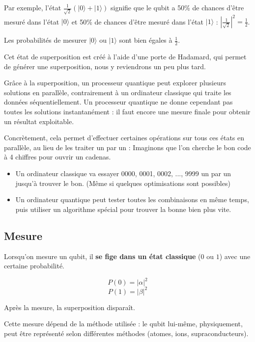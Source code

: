\documentclass{article}
\begin{document}
Par exemple, l’état $\frac{1}{\sqrt{2}}(|0\rangle + |1\rangle)$ signifie que le qubit a 50\% de chances d’être mesuré dans l’état $|0\rangle$ et 50\% de chances d’être mesuré dans l’état $|1\rangle$ : $\left|\frac{1}{\sqrt{2}}\right|^2 = \frac{1}{2}$.

\medskip

Les probabilités de mesurer $|0\rangle$ ou $|1\rangle$ sont bien égales à $\frac{1}{2}$.

Cet état de superposition est créé à l’aide d’une porte de Hadamard, qui permet de générer une superposition, nous y reviendrons un peu plus tard.

Grâce à la superposition, un processeur quantique peut explorer plusieurs solutions en parallèle, contrairement à un ordinateur classique qui traite les données séquentiellement. Un processeur quantique ne donne cependant pas toutes les solutions instantanément : il faut encore une mesure finale pour obtenir un résultat exploitable.

Concrètement, cela permet d’effectuer certaines opérations sur tous ces états en parallèle, au lieu de les traiter un par un : Imaginons que l’on cherche le bon code à 4 chiffres pour ouvrir un cadenas.
\medskip
\begin{itemize}
    \item Un ordinateur classique va essayer 0000, 0001, 0002, ..., 9999 un par un jusqu’à trouver le bon. (Même si quelques optimisations sont possibles)
    \item Un ordinateur quantique peut tester toutes les combinaisons en même temps, puis utiliser un algorithme spécial pour trouver la bonne bien plus vite.
\end{itemize}

\subsection{Mesure}

Lorsqu’on mesure un qubit, il \textbf{se fige dans un état classique} ($0$ ou $1$) avec une certaine probabilité.

\[ P(0) = |\alpha|^2 \]
\[ P(1) = |\beta|^2 \]

Après la mesure, la superposition disparaît.

Cette mesure dépend de la méthode utilisée : le qubit lui-même, physiquement, peut être représenté selon différentes méthodes (atomes, ions, supraconducteurs).\cite{microsoftQubit2025}\cite{stackexchangeQubitState2019}
\end{document}
